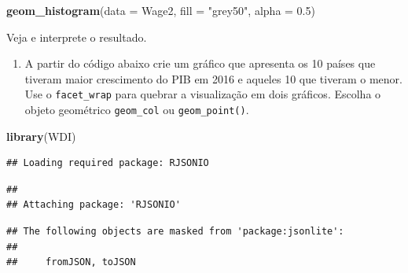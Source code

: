 \documentclass[]{book}
\newenvironment{Shaded}{\begin{snugshade}}{\end{snugshade}}
\newcommand{\KeywordTok}[1]{\textcolor[rgb]{0.13,0.29,0.53}{\textbf{#1}}}
\newcommand{\DataTypeTok}[1]{\textcolor[rgb]{0.13,0.29,0.53}{#1}}
\newcommand{\DecValTok}[1]{\textcolor[rgb]{0.00,0.00,0.81}{#1}}
\newcommand{\FloatTok}[1]{\textcolor[rgb]{0.00,0.00,0.81}{#1}}
\newcommand{\StringTok}[1]{\textcolor[rgb]{0.31,0.60,0.02}{#1}}
\newcommand{\CommentTok}[1]{\textcolor[rgb]{0.56,0.35,0.01}{\textit{#1}}}
\newcommand{\OtherTok}[1]{\textcolor[rgb]{0.56,0.35,0.01}{#1}}
\newcommand{\OperatorTok}[1]{\textcolor[rgb]{0.81,0.36,0.00}{\textbf{#1}}}
\newcommand{\NormalTok}[1]{#1}
\providecommand{\tightlist}{%
  \setlength{\itemsep}{0pt}\setlength{\parskip}{0pt}}
\begin{document}
\begin{Shaded}
\begin{Highlighting}[]
\KeywordTok{geom_histogram}\NormalTok{(}\DataTypeTok{data =}\NormalTok{ Wage2, }\DataTypeTok{fill =} \StringTok{"grey50"}\NormalTok{, }\DataTypeTok{alpha =} \FloatTok{0.5}\NormalTok{)}
\end{Highlighting}
\end{Shaded}

Veja e interprete o resultado.

\begin{enumerate}
\def\labelenumi{\arabic{enumi}.}
\setcounter{enumi}{4}
\tightlist
\item
  A partir do código abaixo crie um gráfico que apresenta os 10 países
  que tiveram maior crescimento do PIB em 2016 e aqueles 10 que tiveram
  o menor. Use o \texttt{facet\_wrap} para quebrar a visualização em
  dois gráficos. Escolha o objeto geométrico \texttt{geom\_col} ou
  \texttt{geom\_point()}.
\end{enumerate}

\begin{Shaded}
\begin{Highlighting}[]
\KeywordTok{library}\NormalTok{(WDI)}
\end{Highlighting}
\end{Shaded}

\begin{verbatim}
## Loading required package: RJSONIO
\end{verbatim}

\begin{verbatim}
## 
## Attaching package: 'RJSONIO'
\end{verbatim}

\begin{verbatim}
## The following objects are masked from 'package:jsonlite':
## 
##     fromJSON, toJSON
\end{verbatim}

\begin{Shaded}
\end{Shaded}
\end{document}
